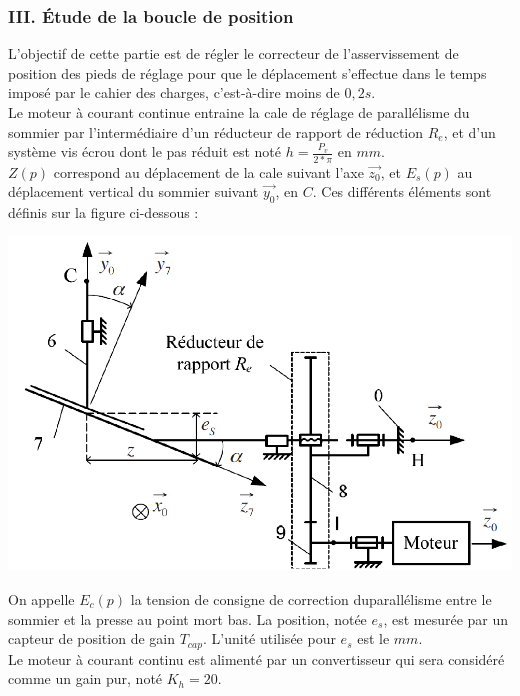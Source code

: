 \subsubsection{III. \'Etude de la boucle de position}
L'objectif de cette partie est de r\'egler le correcteur de l'asservissement de position des pieds de r\'eglage pour que le d\'eplacement s'effectue dans le temps impos\'e par le cahier des charges, c'est-\`a-dire moins de $0,2s$.\\
Le moteur \`a courant continue entraine la cale de r\'eglage de parall\'elisme du sommier par l'interm\'ediaire d'un r\'educteur de rapport de r\'eduction $R_e$, et d'un syst\`eme vis \'ecrou dont le pas r\'eduit est not\'e $h=\frac{P_v}{2*\pi}$ en $mm$.\\
$Z(p)$ correspond au d\'eplacement de la cale suivant l'axe $\overrightarrow{z_0}$, et $E_s(p)$ au d\'eplacement vertical du sommier suivant $\overrightarrow{y_0}$, en $C$. Ces diff\'erents \'el\'ements sont d\'efinis sur la figure ci-dessous :\\

\begin{center}
\includegraphics[scale=0.3]{png/image4_prob3.png}
\end{center}

On appelle $E_c(p)$ la tension de consigne de correction duparall\'elisme entre le sommier et la presse au point mort bas. La position, not\'ee $e_s$, est mesur\'ee par un capteur de position de gain $T_{cap}$. L'unit\'e utilis\'ee pour $e_s$ est le $mm$.\\
Le moteur \`a courant continu est aliment\'e par un convertisseur qui sera consid\'er\'e comme un gain pur, not\'e $K_h = 20$.

